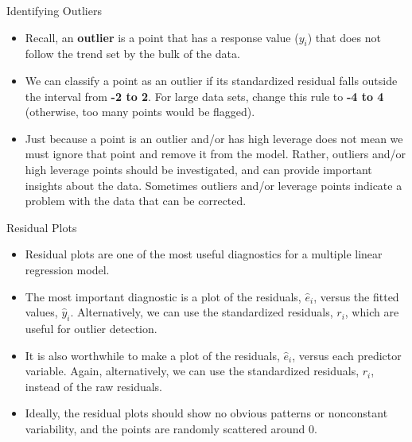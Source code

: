 \documentclass[10pt]{beamer}\usepackage[]{graphicx}\usepackage[]{color}
\begin{document}
\begin{frame}{Identifying Outliers}
\begin{itemize}
\item Recall, an \textbf{outlier} is a point that has a response value ($y_i$) that does not follow the trend set by the bulk of the data. 
\vspace{10pt}
\item We can classify a point as an outlier if its standardized residual falls outside the interval from \textbf{-2 to 2}.  For large data sets, change this rule to \textbf{-4 to 4} (otherwise, too many points would be flagged).
\vspace{10pt}
\item Just because a point is an outlier and/or has high leverage does not mean we must ignore that point and remove it from the model.  Rather, outliers and/or high leverage points should be investigated, and can provide important insights about the data.  Sometimes outliers and/or leverage points indicate a problem with the data that can be corrected.  
\end{itemize}
\end{frame}

\begin{frame}{Residual Plots}
\begin{itemize}
\item Residual plots are one of the most useful diagnostics for a multiple linear regression model.
\vspace{5pt}
\item The most important diagnostic is a plot of the residuals, $\hat{e}_i$, versus the fitted values, $\hat{y}_i$.  Alternatively, we can use the standardized residuals, $r_i$, which are useful for outlier detection.
\vspace{5pt}
\item It is also worthwhile to make a plot of the residuals, $\hat{e}_i$, versus each predictor variable.  Again, alternatively, we can use the standardized residuals, $r_i$, instead of the raw residuals.
\vspace{5pt}
\item Ideally, the residual plots should show no obvious patterns or nonconstant variability, and the points are randomly scattered around 0.
\end{itemize}
\end{frame}
\end{document}
